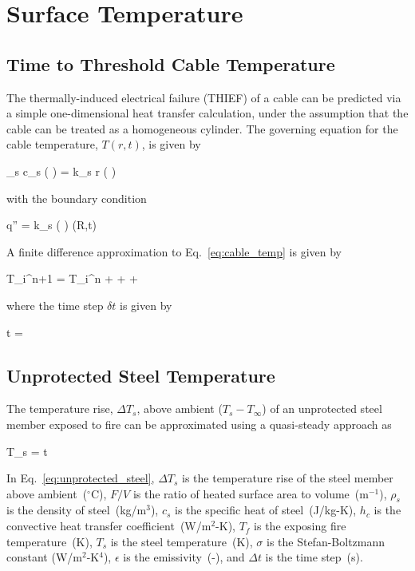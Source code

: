 \chapter{Surface Temperature}

\section{Time to Threshold Cable Temperature}

The thermally-induced electrical failure (THIEF) of a cable can be predicted via a simple
one-dimensional heat transfer calculation, under the assumption that the cable can be
treated as a homogeneous cylinder. The governing equation for the cable temperature,
$T(r,t)$, is given by

\be
\rho_s c_s \left(  \right) =   k_s r \left(  \right)
\label{eq:cable_temp}
\ee

\noindent with the boundary condition

\be
\dot q'' = k_s \left(  \right) (R,t)
\ee

\noindent A finite difference approximation to Eq.~\ref{eq:cable_temp} is given by

\be
T_i^{n+1} = T_i^n +  +  + 
\ee

\noindent where the time step $\delta t$ is given by

\be
\delta t = 
\ee


\clearpage


\section{Unprotected Steel Temperature}

The temperature rise, $\Delta T_s$, above ambient ($T_s - T_\infty$) of an unprotected steel member exposed to fire can be approximated using a quasi-steady approach as

\be
\Delta T_s =    \Delta t
\label{eq:unprotected_steel}
\ee

In Eq.~\ref{eq:unprotected_steel}, $\Delta T_s$ is the temperature rise of the steel member above ambient~($^\circ$C), $F/V$ is the ratio of heated surface area to volume~(m$^{-1}$), $\rho_s$ is the density of steel~(kg/m$^3$), $c_s$ is the specific heat of steel~(J/kg-K), $h_c$ is the convective heat transfer coefficient~(W/m$^2$-K), $T_f$ is the exposing fire temperature~(K), $T_s$ is the steel temperature~(K), $\sigma$ is the Stefan-Boltzmann constant (W/m$^2$-K$^4$), $\epsilon$ is the emissivity~(-), and $\Delta t$ is the time step~(s).

